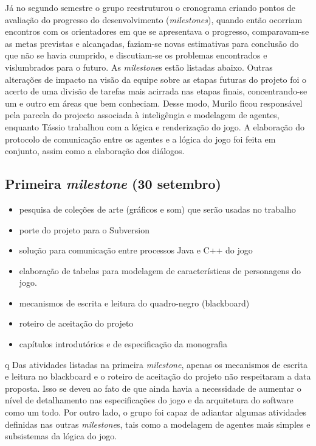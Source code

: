 Já no segundo semestre o grupo reestruturou o cronograma criando pontos de avaliação do progresso do desenvolvimento (\emph{\emph{milestone}s}), quando então ocorriam encontros com os orientadores em que se apresentava o progresso, comparavam-se as metas previstas e alcançadas, faziam-se novas estimativas para conclusão do que não se havia cumprido, e discutiam-se os problemas encontrados e vislumbrados para o futuro. As \emph{milestone}s estão listadas abaixo. Outras alterações de impacto na visão da equipe sobre as etapas futuras do projeto foi o acerto de uma divisão de tarefas mais acirrada nas etapas finais, concentrando-se um e outro em áreas que bem conheciam. Desse modo, Murilo ficou responsável pela parcela do projecto associada à inteligêngia e modelagem de agentes, enquanto Tássio trabalhou com a lógica e renderização do jogo. A elaboração do protocolo de comunicação entre os agentes e a lógica do jogo foi feita em conjunto, assim como a elaboração dos diálogos.

\subsection{Primeira \emph{milestone} (30 setembro)}
\begin{itemize}
\item pesquisa de coleções de arte (gráficos e som) que serão usadas no trabalho
\item porte do projeto para o Subversion
\item solução para comunicação entre processos Java e C++ do jogo
\item elaboração de tabelas para modelagem de características de personagens do jogo.
\item mecanismos de escrita e leitura do quadro-negro (blackboard)
\item roteiro de aceitação do projeto
\item capítulos introdutórios e de especificação da monografia
\end{itemize}
q
Das atividades listadas na primeira \emph{milestone}, apenas os mecanismos de escrita e leitura no blackboard e o roteiro de aceitação do projeto não respeitaram a data proposta. Isso se deveu ao fato de que ainda havia a necessidade de aumentar o nível de detalhamento  nas especificações do jogo e da arquitetura do software como um todo. Por outro lado, o grupo foi capaz de adiantar algumas atividades definidas nas outras \emph{milestone}s, tais como a modelagem de agentes mais simples e subsistemas da lógica do jogo.

